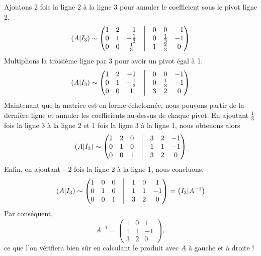 {	Ajoutons 2 fois la ligne 2 à la ligne 3 pour annuler le coefficient sous le pivot ligne 2.
		\[ (A | I_3)  \sim\begin{pmatrix} 1 & 2 & -1 &\bigm| & 0 & 0 & -1 \\ 0 & 1 & -\frac13 & \bigm| & 0 & \frac13 & -1 \\ 0 & 0 & \frac13 & \bigm| & 1 & \frac23 & 0\end{pmatrix} \]
	Multiplions la troisième ligne par $3$ pour avoir un pivot égal à 1.
		\[ (A | I_3)  \sim\begin{pmatrix} 1 & 2 & -1 &\bigm| & 0 & 0 & -1 \\ 0 & 1 & -\frac13 & \bigm| & 0 & \frac13 & -1 \\ 0 & 0 & 1 & \bigm| & 3 & 2 & 0\end{pmatrix} \]
	Maintenant que la matrice est en forme échelonnée, nous pouvons partir de la dernière ligne et annuler les coefficients au-dessus de chaque pivot.
	En ajoutant $\frac13$ fois la ligne 3 à la ligne 2 et $1$ fois la ligne 3 à la ligne 1, nous obtenons alors
		\[ (A | I_3)  \sim\begin{pmatrix} 1 & 2 & 0 &\bigm| & 3 & 2 & -1 \\ 0 & 1 & 0 & \bigm| & 1 & 1 & -1 \\ 0 & 0 & 1 & \bigm| & 3 & 2 & 0\end{pmatrix} \]
	Enfin, en ajoutant $-2$ fois la ligne 2 à la ligne 1, nous concluons.
		\[ (A | I_3)  \sim\begin{pmatrix} 1 & 0 & 0 &\bigm| & 1 & 0 & 1 \\ 0 & 1 & 0 & \bigm| & 1 & 1 & -1 \\ 0 & 0 & 1 & \bigm| & 3 & 2 & 0\end{pmatrix} = \left(I_3 | A^{-1}\right) \]
	Par conséquent,
		\[ A^{-1} = \begin{pmatrix} 1 & 0 & 1 \\ 1 & 1 & -1 \\ 3 & 2 & 0\end{pmatrix}, \]
	ce que l'on vérifiera bien sûr en calculant le produit avec $A$ à gauche et à droite !
}




